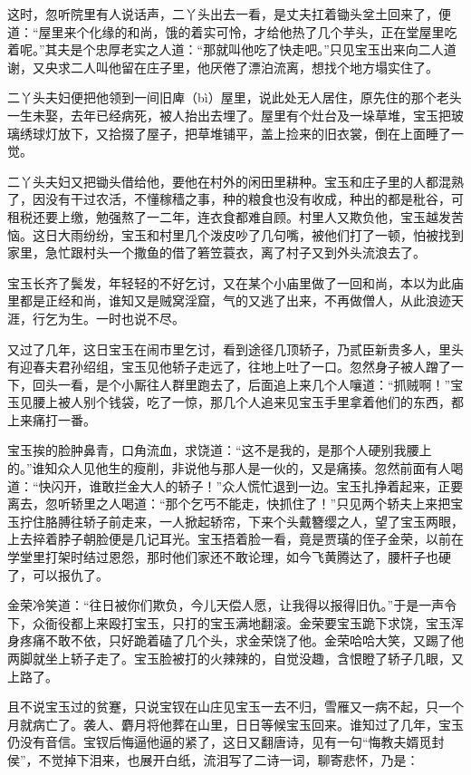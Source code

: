 \documentclass[12pt,oneside]{book}
\begin{document}
这时，忽听院里有人说话声，二丫头出去一看，是丈夫扛着锄头坌土回来了，便道：“屋里来个化缘的和尚，饿的着实可怜，才给他热了几个芋头，正在堂屋里吃着呢。”其夫是个忠厚老实之人道：“那就叫他吃了快走吧。”只见宝玉出来向二人道谢，又央求二人叫他留在庄子里，他厌倦了漂泊流离，想找个地方塌实住了。

二丫头夫妇便把他领到一间旧庳（bì）屋里，说此处无人居住，原先住的那个老头一生未娶，去年已经病死，被人抬出去埋了。屋里有个灶台及一垛草堆，宝玉把玻璃绣球灯放下，又拾掇了屋子，把草堆铺平，盖上捡来的旧衣裳，倒在上面睡了一觉。

二丫头夫妇又把锄头借给他，要他在村外的闲田里耕种。宝玉和庄子里的人都混熟了，因没有干过农活，不懂稼穑之事，种的粮食也没有收成，种出的都是秕谷，可租税还要上缴，勉强熬了一二年，连衣食都难自顾。村里人又欺负他，宝玉越发苦恼。这日大雨纷纷，宝玉和村里几个泼皮吵了几句嘴，被他们打了一顿，怕被找到家里，急忙跟村头一个撒鱼的借了箬笠蓑衣，离了村子又到外头流浪去了。

宝玉长齐了鬓发，年轻轻的不好乞讨，又在某个小庙里做了一回和尚，本以为此庙里都是正经和尚，谁知又是贼窝淫窟，气的又逃了出来，不再做僧人，从此浪迹天涯，行乞为生。一时也说不尽。

又过了几年，这日宝玉在闹市里乞讨，看到途径几顶轿子，乃贰臣新贵多人，里头有迎春夫君孙绍组，宝玉见他轿子走远了，往地上吐了一口。忽然身子被人蹭了一下，回头一看，是个小厮往人群里跑去了，后面追上来几个人嚷道：“抓贼啊！”宝玉见腰上被人别个钱袋，吃了一惊，那几个人追来见宝玉手里拿着他们的东西，都上来痛打一番。

宝玉挨的脸肿鼻青，口角流血，求饶道：“这不是我的，是那个人硬别我腰上的。”谁知众人见他生的瘦削，非说他与那人是一伙的，又是痛揍。忽然前面有人喝道：“快闪开，谁敢拦金大人的轿子！”众人慌忙退到一边。宝玉扎挣着起来，正要离去，忽听轿里之人喝道：“那个乞丐不能走，快抓住了！”只见两个轿夫上来把宝玉拧住胳膊往轿子前走来，一人掀起轿帘，下来个头戴簪缨之人，望了宝玉两眼，上去捽着脖子朝脸便是几记耳光。宝玉捂着脸一看，竟是贾璜的侄子金荣，以前在学堂里打架时结过恩怨，那时他们家还不敢论理，如今飞黄腾达了，腰杆子也硬了，可以报仇了。

金荣冷笑道：“往日被你们欺负，今儿天偿人愿，让我得以报得旧仇。”于是一声令下，众衙役都上来殴打宝玉，只打的宝玉满地翻滚。金荣要宝玉跪下求饶，宝玉浑身疼痛不敢不依，只好跪着磕了几个头，求金荣饶了他。金荣哈哈大笑，又踢了他两脚就坐上轿子走了。宝玉脸被打的火辣辣的，自觉没趣，含恨瞪了轿子几眼，又上路了。

且不说宝玉过的贫蹇，只说宝钗在山庄见宝玉一去不归，雪雁又一病不起，只一个月就病亡了。袭人、麝月将他葬在山里，日日等候宝玉回来。谁知过了几年，宝玉仍没有音信。宝钗后悔逼他逼的紧了，这日又翻唐诗，见有一句“悔教夫婿觅封侯”，不觉掉下泪来，也展开白纸，流泪写了二诗一词，聊寄悲怀，乃是：
\end{document}
